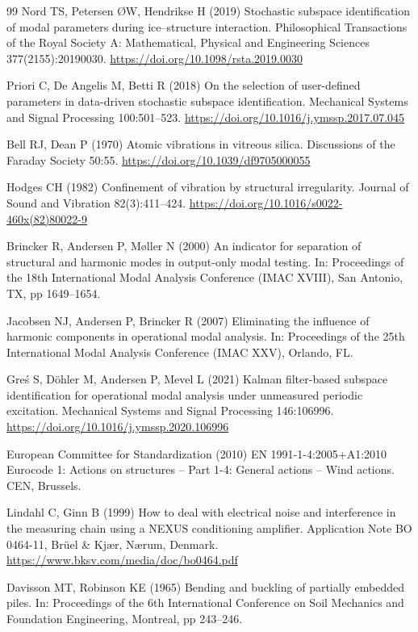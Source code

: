 \documentclass[11pt]{article}
\begin{document}
\begin{thebibliography}{99}
Nord TS, Petersen {\O}W, Hendrikse H (2019) Stochastic subspace identification of modal parameters during ice--structure interaction. Philosophical Transactions of the Royal Society A: Mathematical, Physical and Engineering Sciences 377(2155):20190030. \url{https://doi.org/10.1098/rsta.2019.0030}

Priori C, De Angelis M, Betti R (2018) On the selection of user-defined parameters in data-driven stochastic subspace identification. Mechanical Systems and Signal Processing 100:501--523. \url{https://doi.org/10.1016/j.ymssp.2017.07.045}

Bell RJ, Dean P (1970) Atomic vibrations in vitreous silica. Discussions of the Faraday Society 50:55. \url{https://doi.org/10.1039/df9705000055}

Hodges CH (1982) Confinement of vibration by structural irregularity. Journal of Sound and Vibration 82(3):411--424. \url{https://doi.org/10.1016/s0022-460x(82)80022-9}

Brincker R, Andersen P, M{\o}ller N (2000) An indicator for separation of structural and harmonic modes in output-only modal testing. In: Proceedings of the 18th International Modal Analysis Conference (IMAC XVIII), San Antonio, TX, pp 1649--1654.

Jacobsen NJ, Andersen P, Brincker R (2007) Eliminating the influence of harmonic components in operational modal analysis. In: Proceedings of the 25th International Modal Analysis Conference (IMAC XXV), Orlando, FL.

Gre{\'s} S, D{\"o}hler M, Andersen P, Mevel L (2021) Kalman filter-based subspace identification for operational modal analysis under unmeasured periodic excitation. Mechanical Systems and Signal Processing 146:106996. \url{https://doi.org/10.1016/j.ymssp.2020.106996}

European Committee for Standardization (2010) EN 1991-1-4:2005+A1:2010 Eurocode 1: Actions on structures -- Part 1-4: General actions -- Wind actions. CEN, Brussels.

Lindahl C, Ginn B (1999) How to deal with electrical noise and interference in the measuring chain using a NEXUS conditioning amplifier. Application Note BO 0464-11, Br{\"u}el \& Kj{\ae}r, N{\ae}rum, Denmark. \url{https://www.bksv.com/media/doc/bo0464.pdf}

Davisson MT, Robinson KE (1965) Bending and buckling of partially embedded piles. In: Proceedings of the 6th International Conference on Soil Mechanics and Foundation Engineering, Montreal, pp 243--246.


\end{thebibliography}
\end{document}
